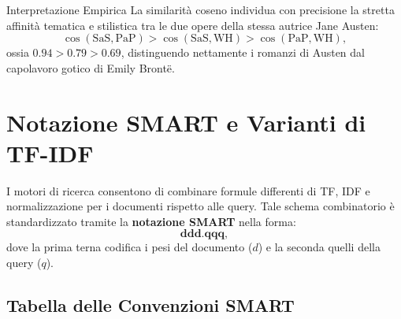 \begin{noteblock}{Interpretazione Empirica}
La similarit\`a coseno individua con precisione la stretta affinit\`a tematica e stilistica tra le due opere della stessa autrice Jane Austen:
\begin{equation}
\cos(\text{SaS}, \text{PaP}) > \cos(\text{SaS}, \text{WH}) > \cos(\text{PaP}, \text{WH}),
\end{equation}
ossia $0.94 > 0.79 > 0.69$, distinguendo nettamente i romanzi di Austen dal capolavoro gotico di Emily Bront\"e.
\end{noteblock}

\FloatBarrier
\section{Notazione SMART e Varianti di TF-IDF}
\label{sec:smart-notation}

I motori di ricerca consentono di combinare formule differenti di TF, IDF e normalizzazione per i documenti rispetto alle query. Tale schema combinatorio \`e standardizzato tramite la \textbf{notazione SMART} nella forma:
\begin{equation}
\mathbf{ddd.qqq},
\end{equation}
dove la prima terna codifica i pesi del documento ($d$) e la seconda quelli della query ($q$).

\subsection{Tabella delle Convenzioni SMART}

\begin{table}[H]
\centering
\small
{}
\caption{Convenzione SMART per la composizione modulare dei pesi vettoriali.}
\label{tab:smart-notation}
\end{table}

